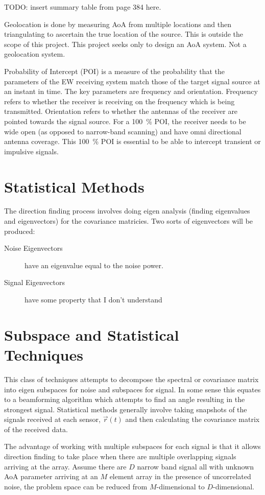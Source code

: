 TODO: insert summary table from page 384 here.

Geolocation is done by measuring AoA from multiple locations and then triangulating to ascertain the true location of the source. This is outside the scope of this project. This project seeks only to design an AoA system. Not a geolocation system. 

Probability of Intercept (POI) is a measure of the probability that the parameters of the EW receiving system match those of the target signal source at an instant in time. The key parameters are frequency and orientation. Frequency refers to whether the receiver is receiving on the frequency which is being transmitted. Orientation refers to whether the antennas of the receiver are pointed towards the signal source. 
For a \SI{100}{\percent} POI, the receiver needs to be wide open (as opposed to narrow-band scanning) and have omni directional antenna coverage. This \SI{100}{\percent} POI is essential to be able to intercept transient or impulsive signals.

\section{Statistical Methods}


The direction finding process involves doing eigen analysis (finding eigenvalues and eigenvectors) for the covariance matricies. 
Two sorts of eigenvectors will be produced:
\begin{description}
  \item[Noise Eigenvectors] have an eigenvalue equal to the noise power.
  \item[Signal Eigenvectors] have some property that I don't understand
\end{description}

\section{Subspace and Statistical Techniques}
This class of techniques attempts to decompose the spectral or covariance matrix into eigen subspaces for noise and subspaces for signal. In some sense this equates to a beamforming algorithm which attempts to find an angle resulting in the strongest signal. 
Statistical methods generally involve taking snapshots of the signals received at each sensor, \(\vec{r}(t)\) and then calculating the covariance matrix of the received data\cite{poisel2012electronic}.

The advantage of working with multiple subspaces for each signal is that it allows direction finding to take place when there are multiple overlapping signals arriving at the array. Assume there are \(D\) narrow band signal all with unknown AoA parameter arriving at an \(M\) element array in the presence of uncorrelated noise, the problem space can be reduced from \(M\)-dimensional to \(D\)-dimensional\cite{van2004detection}.

